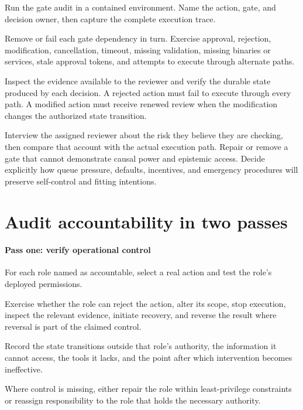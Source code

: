 Run the gate audit in a contained environment. Name the action, gate, and decision owner, then capture the complete execution trace.

Remove or fail each gate dependency in turn. Exercise approval, rejection, modification, cancellation, timeout, missing validation, missing binaries or services, stale approval tokens, and attempts to execute through alternate paths.

Inspect the evidence available to the reviewer and verify the durable state produced by each decision. A rejected action must fail to execute through every path. A modified action must receive renewed review when the modification changes the authorized state transition.

Interview the assigned reviewer about the risk they believe they are checking, then compare that account with the actual execution path. Repair or remove a gate that cannot demonstrate causal power and epistemic access. Decide explicitly how queue pressure, defaults, incentives, and emergency procedures will preserve self-control and fitting intentions.

\hypertarget{audit-accountability-in-two-passes}{%
\section{Audit accountability in two passes}\label{audit-accountability-in-two-passes}}

\hypertarget{pass-one-verify-operational-control}{%
\paragraph{Pass one: verify operational control}\label{pass-one-verify-operational-control}}

For each role named as accountable, select a real action and test the role's deployed permissions.

Exercise whether the role can reject the action, alter its scope, stop execution, inspect the relevant evidence, initiate recovery, and reverse the result where reversal is part of the claimed control.

Record the state transitions outside that role's authority, the information it cannot access, the tools it lacks, and the point after which intervention becomes ineffective.

Where control is missing, either repair the role within least-privilege constraints or reassign responsibility to the role that holds the necessary authority.

